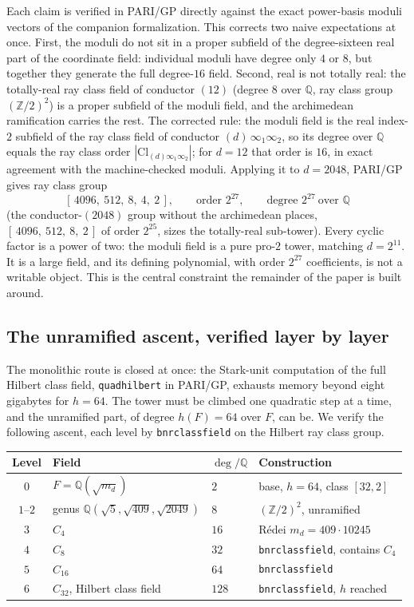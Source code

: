 \documentclass[12pt,a4paper]{article}
\newcommand{\Fd}{F}
\newcommand{\md}{m_d}
\begin{document}
Each claim is verified in PARI/GP directly against the exact power-basis moduli
vectors of the companion formalization. This corrects two naive expectations at
once. First, the moduli do not sit in a proper subfield of the degree-sixteen
real part of the coordinate field: individual moduli have degree only $4$ or
$8$, but together they generate the full degree-$16$ field. Second, real is not
totally real: the totally-real ray class field of conductor $(12)$ (degree $8$
over $\mathbb{Q}$, ray class group $(\mathbb{Z}/2)^2$) is a proper subfield of
the moduli field, and the archimedean ramification carries the rest. The
corrected rule: the moduli field is the real index-$2$ subfield of the ray
class field of conductor $(d)\,\infty_1\infty_2$, so its degree over
$\mathbb{Q}$ equals the ray class order $|\mathrm{Cl}_{(d)\infty_1\infty_2}|$;
for $d=12$ that order is $16$, in exact agreement with the machine-checked
moduli. Applying it to $d=2048$, PARI/GP gives ray class group
\[
[\,4096,\ 512,\ 8,\ 4,\ 2\,],\qquad \text{order } 2^{27},
\qquad \text{degree } 2^{27}\ \text{over }\mathbb{Q}
\]
(the conductor-$(2048)$ group without the archimedean places,
$[\,4096,\ 512,\ 8,\ 2\,]$ of order $2^{25}$, sizes the totally-real
sub-tower). Every cyclic factor is a power of two: the moduli field is a pure
pro-$2$ tower, matching $d=2^{11}$. It is a large field, and its defining
polynomial, with order $2^{27}$ coefficients, is not a writable object. This is
the central constraint the remainder of the paper is built around.

\subsection{The unramified ascent, verified layer by layer}

The monolithic route is closed at once: the Stark-unit computation of the full
Hilbert class field, \texttt{quadhilbert} in PARI/GP, exhausts memory beyond
eight gigabytes for $h=64$. The tower must be climbed one quadratic step at a
time, and the unramified part, of degree $h(\Fd)=64$ over $\Fd$, can be. We
verify the following ascent, each level by \texttt{bnrclassfield} on the Hilbert
ray class group.

\begin{center}
\begin{tabular}{@{}clll@{}}
\toprule
Level & Field & $\deg/\mathbb{Q}$ & Construction \\
\midrule
$0$ & $\Fd = \mathbb{Q}(\sqrt{\md})$ & $2$ & base, $h=64$, class $[32,2]$ \\
$1$--$2$ & genus $\mathbb{Q}(\sqrt5,\sqrt{409},\sqrt{2049})$ & $8$ & $(\mathbb{Z}/2)^2$, unramified \\
$3$ & $C_4$ & $16$ & R\'edei $\md = 409\cdot 10245$ \\
$4$ & $C_8$ & $32$ & \texttt{bnrclassfield}, contains $C_4$ \\
$5$ & $C_{16}$ & $64$ & \texttt{bnrclassfield} \\
$6$ & $C_{32}$, Hilbert class field & $128$ & \texttt{bnrclassfield}, $h$ reached \\
\bottomrule
\end{tabular}
\end{center}
\end{document}
